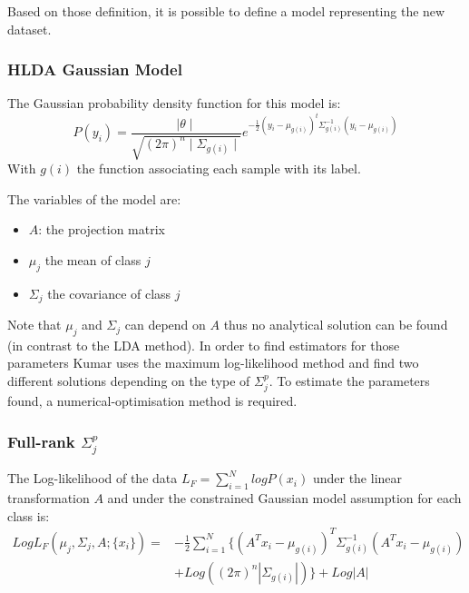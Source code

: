 Based on those definition, it is possible to define a model representing the new dataset.

\subsubsection{HLDA Gaussian Model}

The Gaussian probability density function for this model is:
$$P(y_i) = \frac{\mid \theta \mid}{\sqrt{(2\pi)^n \mid \Sigma_{g(i)} \mid}}
e^{-\frac{1}{2} (y_i - \mu_{g(i)})^t \Sigma_{g(i)}^{-1} (y_i - \mu_{g(i)})}$$
With $g(i)$ the function associating each sample with its label.

The variables of the model are:
\begin{itemize}
  \item $A$: the projection matrix
  \item $\mu_j$ the mean of class $j$
  \item $\Sigma_j$ the covariance of class $j$
\end{itemize}

Note that $\mu_j$ and $\Sigma_j$ can depend on $A$ thus no analytical solution can be found (in contrast to the LDA method). In order to find estimators for those parameters Kumar\cite{kumar.1997} uses the maximum log-likelihood method and find two different solutions depending on the type of $\Sigma_j^p$.
To estimate the parameters found, a numerical-optimisation method is required.

\subsubsection{Full-rank $\Sigma_j^p$}

The Log-likelihood of the data $L_F = \sum\limits_{i = 1}^N log P(x_i)$ under the linear transformation $A$ and under the constrained Gaussian model assumption for each class is:
$$\begin{array}{cl}
  Log L_F(\mu_j, \Sigma_j, A; \{x_i\}) = & - \frac{1}{2} \sum\limits_{i = 1}^N\{(A^T x_i - \mu_{g(i)})^T\Sigma_{g(i)}^{-1}
  (A^T x_i - \mu_{g(i)}) \\
  & + Log((2\pi)^n|\Sigma_{g(i)}|)\} + Log|A|
\end{array}$$

